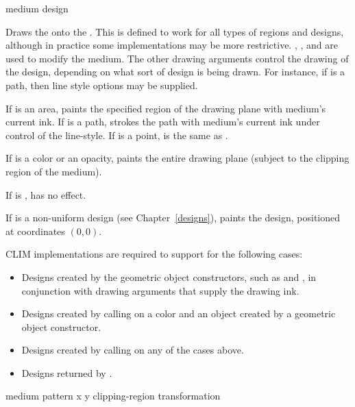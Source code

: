  {medium design \key \DrawingOptions \LineJointCapOptions\ \TextOptions}

Draws the   onto the  .  This is
defined to work for all types of regions and designs, although in practice some
implementations may be more restrictive.  , , and
 are used to modify the medium.  The other drawing
arguments control the drawing of the design, depending on what sort of design is
being drawn.  For instance, if  is a path, then line style options
may be supplied.

If  is an area,  paints the specified region of the
drawing plane with medium's current ink.  If  is a
path,  strokes the path with medium's current ink under control
of the line-style.  If  is a point,  is the same as
.

If  is a color or an opacity,  paints the entire
drawing plane (subject to the clipping region of the medium).

If  is ,  has no effect.

If  is a non-uniform design (see Chapter~\ref{designs}),
 paints the design, positioned at coordinates $(0,0)$.

CLIM implementations are required to support  for the following
cases:

\begin{itemize}
\item Designs created by the geometric object constructors, such as
 and , in conjunction with drawing arguments that
supply the drawing ink.

\item Designs created by calling  on a color and an object
created by a geometric object constructor.

\item Designs created by calling  on any of the cases above.

\item Designs returned by .
\end{itemize}


 {medium pattern x y \key clipping-region transformation}


